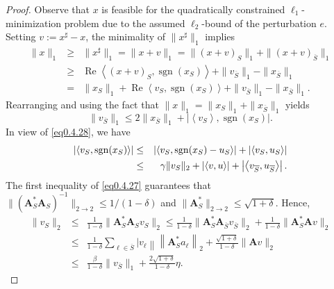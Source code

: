 \begin{proof}
    Observe that $x$ is feasible for the quadratically constrained $\ell_1$-minimization problem due to the assumed $\ell_2$-bound of the perturbation $e$. Setting $v:=x^{\sharp} - x$, the minimality of $\|x^{\sharp}\|_1$ implies
    \begin{eqnarray*}
        \|x\|_1 &\geq& \|x^{\sharp}\|_1 = \|x+v\|_1 = \|(x+v)_S\|_1 + \|(x+v)_{\overline{S}}\|_1 \\
        &\geq& \mathop{\mathrm{Re}}\left<(x+v)_S, \mathop{\mathrm{sgn}}(x_S)\right> +\|v_{\overline{S}}\|_1 - \|x_{\overline{S}}\|_1 \\
        &=& \|x_S\|_1 + \mathop{\mathrm{Re}}\left<v_S, \mathop{\mathrm{sgn}}(x_S)\right> + \|v_{\overline{S}}\|_1 - \|x_{\overline{S}}\|_1.
    \end{eqnarray*}
    Rearranging and using the fact that $\|x\|_1 = \|x_S\|_1 + \|x_{\overline{S}}\|_1$ yields 
    \begin{equation}
        \|v_{\overline{S}}\|_1 \leq 2\|x_{\overline{S}}\|_1 + \left|\left<v_S\right>, \mathop{\mathrm{sgn}}(x_S)\right|.
        \label{eq0.4.29}
    \end{equation}
    In view of \cref{eq0.4.28}, we have
    \begin{eqnarray}
        \label{eq0.4.30}
        \left|\left<v_S, \mathop{\mathrm{sgn}}(x_S)\right>\right| &\leq& \left|\left<v_S, \mathop{\mathrm{sgn}}(x_S) - u_S\right>\right| + \left|\left<v_S, u_S\right>\right| \notag \\
        &\leq&\gamma \|v_S\|_2 + \left|\left<v,u\right>\right| + \left|\left<v_{\overline{S}}, u_{\overline{S}}\right>\right|.
    \end{eqnarray}
    The first inequality of \cref{eq0.4.27} guarantees that $\|(\mathbf{A}^*_S \mathbf{A}_S)^{-1}\|_{2\rightarrow 2} \leq 1/(1-\delta)$ and $\|\mathbf{A}^*_S\|_{2 \rightarrow 2} \leq \sqrt{1+\delta}$. Hence,
    \begin{eqnarray}
        \label{eq0.4.31}
        \|v_S\|_2 &\leq& \frac{1}{1-\delta} \|\mathbf{A}^*_S\mathbf{A}_S v_S\|_2 \leq \frac{1}{1-\delta} \|\mathbf{A}^*_S \mathbf{A}_{\overline{S}}v_{\overline{S}}\|_2 + \frac{1}{1-\delta} \|\mathbf{A}^*_S \mathbf{A} v\|_2 \\
        &\leq& \frac{1}{1-\delta}\sum\limits_{\ell \in \overline{S}}^{}\left|v_{\ell}\right\| \left\|\mathbf{A}^*_S a_{\ell}\right\|_2 + \frac{\sqrt{1+\delta}}{1-\delta} \|\mathbf{A}v\|_2 \\
        &\leq& \frac{\beta}{1-\delta}\|v_{\overline{S}}\|_1 + \frac{2\sqrt{1+\delta}}{1-\delta} \eta.

\end{eqnarray}
\end{proof}
